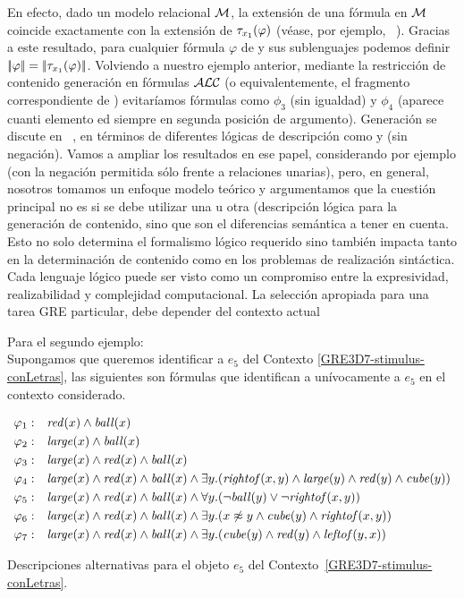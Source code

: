 En efecto, dado un modelo relacional $\mathcal{M}$, la extensi\'on de una f\'ormula \ALC en $\mathcal{M}$ coincide exactamente con la extensi\'on de $\mathit{\tau}_{x_1}(\varphi)$ (v\'ease, por ejemplo, ~\cite{baad:desc03}). Gracias
a este resultado, para cualquier f\'ormula $\varphi$ de \ALC y sus sublenguajes podemos definir $|\!|\varphi|\!| = |\!|\mathit{\tau}_{x_1}(\varphi)|\!|$.
 Volviendo a nuestro ejemplo anterior, mediante la restricci\'on de contenido
generaci\'on en f\'ormulas $\mathcal{ALC}$ (o equivalentemente, el fragmento correspondiente de \FOL)
evitar\'iamos f\'ormulas como
$\phi_3$ (sin igualdad) y
$\phi_4$ (aparece cuanti elemento ed
siempre en segunda posici\'on de argumento).
Generaci\'on se discute en ~\cite{areces08}, en t\'erminos de diferentes l\'ogicas de descripci\'on como \ALC
y \EL (\ALC sin negaci\'on). Vamos a ampliar los resultados en ese papel, considerando por ejemplo \ELAN (\ALC con la negaci\'on permitida s\'olo frente a relaciones unarias), pero, en general, nosotros tomamos un enfoque modelo te\'orico y argumentamos que la cuesti\'on principal no es si se debe utilizar una u otra (descripci\'on l\'ogica para la generaci\'on de contenido, sino que son el diferencias sem\'antica a tener en cuenta. Esto no solo determina el formalismo l\'ogico requerido sino tambi\'en impacta tanto en la determinaci\'on de contenido como en los problemas de realizaci\'on sint\'actica. Cada
lenguaje l\'ogico puede ser visto como un compromiso entre la expresividad, realizabilidad y complejidad computacional. La selecci\'on apropiada para una tarea GRE particular, debe depender del contexto actual




Para el segundo ejemplo: \\
Supongamos que queremos identificar a $e_5$ del Contexto \ref{GRE3D7-stimulus-conLetras}, las siguientes son f\'ormulas que identifican a un\'ivocamente a $e_5$ en el contexto considerado.

\begin{table}
$$
\begin{array}{cl}
 \varphi_1: & \mathit{red}(x) \land \mathit{ball}(x)\\[3pt]
 \varphi_2: & \mathit{large}(x) \land \mathit{ball}(x)\\[3pt]
 \varphi_3: & \mathit{large}(x) \land \mathit{red}(x) \land \mathit{ball}(x)\\[3pt]
 \varphi_4: & \mathit{large}(x) \land \mathit{red}(x) \land \mathit{ball}(x) \land
   \exists y . (\mathit{rightof}(x,y) \land \mathit{large}(y) \land \mathit{red}(y) \land \mathit{cube}(y))\\[3pt]
 \varphi_5: & \mathit{large}(x) \land \mathit{red}(x) \land \mathit{ball}(x) \land
  \forall y . (\neg \mathit{ball}(y) \lor \neg \mathit{rightof}(x,y))\\[3pt]
 \varphi_6: & \mathit{large}(x) \land \mathit{red}(x) \land \mathit{ball}(x) \land
  \exists y . (x \not\approx y \land \mathit{cube}(y) \land \mathit{rightof}(x,y))\\[3pt]
 \varphi_7: & \mathit{large}(x) \land \mathit{red}(x) \land \mathit{ball}(x) \land
  \exists y . (\mathit{cube}(y) \land \mathit{red}(y) \land \mathit{leftof}(y,x))
 \end{array}
$$
\caption{Descripciones alternativas para el objeto $e_5$ del Contexto~\ref{GRE3D7-stimulus-conLetras}.}\label{tab:phis}
\end{table}

